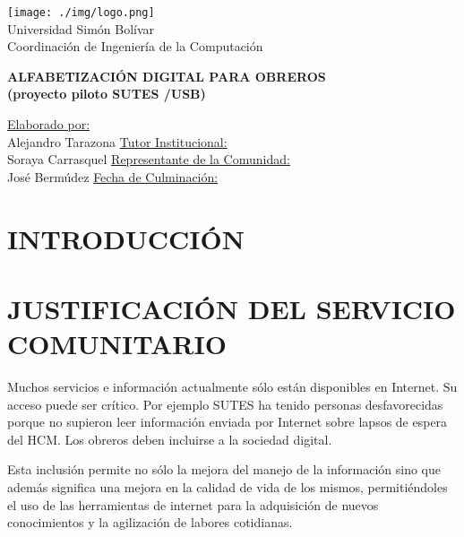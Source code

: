 \documentclass[letterpaper,12pt]{article}
\begin{document}
	
	\begin{center}
		\texttt{[image: ./img/logo.png]} \\
		Universidad Simón Bolívar \\
		Coordinación de Ingeniería de la Computación
        
		\vfill
		{\LARGE \textbf{ALFABETIZACIÓN DIGITAL PARA OBREROS \\ (proyecto piloto SUTES /USB)} }
		\vfill
        
        
		\underline{Elaborado por:}\\
		Alejandro Tarazona
        \linebreak
        \linebreak
		\underline{Tutor Institucional:}\\
		Soraya Carrasquel
        \linebreak
        \linebreak
		\underline{Representante de la Comunidad:}\\
		José Bermúdez
		\linebreak
        \linebreak
        \linebreak
		\underline{Fecha de Culminación:}\\
		
	\end{center}
	\pagebreak
    
	\tableofcontents
	\pagebreak
	
	\section{INTRODUCCIÓN}
	\pagebreak
	
	\section{JUSTIFICACIÓN DEL SERVICIO\\ COMUNITARIO}
    
		Muchos servicios e información actualmente sólo están disponibles en Internet. Su acceso puede ser crítico. Por ejemplo SUTES ha tenido personas desfavorecidas porque no supieron leer información enviada por Internet sobre lapsos de espera del HCM. Los obreros deben incluirse a la sociedad digital.
        
        Esta inclusión permite no sólo la mejora del manejo de la información sino que además significa una mejora en la calidad de vida de los mismos, permitiéndoles el uso de las herramientas de internet para la adquisición de nuevos conocimientos y la agilización de labores cotidianas.
	\pagebreak
	
\end{document}
